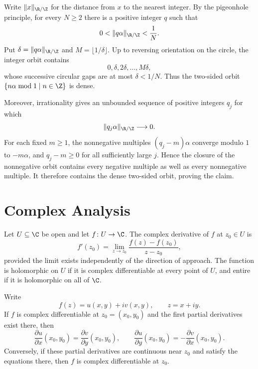     \begin{idea}
        Write $\lVert x\rVert_{\R/\Z}$ for the distance from $x$ to the nearest
        integer. By the pigeonhole principle, for every $N\geq2$ there is a
        positive integer $q$ such that
        \[
            0<\lVert q\alpha\rVert_{\R/\Z}<\frac1N.
        \]
        Put $\delta=\lVert q\alpha\rVert_{\R/\Z}$ and
        $M=\lfloor1/\delta\rfloor$. Up to reversing orientation on the circle,
        the integer orbit contains
        \[
            0,\delta,2\delta,\dots,M\delta,
        \]
        whose successive circular gaps are at most $\delta<1/N$. Thus the
        two-sided orbit $\{n\alpha\bmod1\mid n\in\Z\}$ is dense.

        Moreover, irrationality gives an unbounded sequence of positive
        integers $q_j$ for which
        \[
            \lVert q_j\alpha\rVert_{\R/\Z}\longrightarrow0.
        \]
        For each fixed $m\geq1$, the nonnegative multiples
        $(q_j-m)\alpha$ converge modulo $1$ to $-m\alpha$, and $q_j-m\geq0$
        for all sufficiently large $j$. Hence the closure of the nonnegative
        orbit contains every negative multiple as well as every nonnegative
        multiple. It therefore contains the dense two-sided orbit, proving the
        claim.
    \end{idea}

    \section*{Complex Analysis}

    \begin{definition}
        Let $U\subseteq\C$ be open and let $f\colon U\to\C$. The complex derivative of
        $f$ at $z_0\in U$ is
        \[
            f'(z_0)
            =
            \lim\limits_{z\to z_0}
            \frac{f(z)-f(z_0)}{z-z_0},
        \]
        provided the limit exists independently of the direction of approach.
        The function is holomorphic on $U$ if it is complex differentiable at
        every point of $U$, and entire if it is holomorphic on all of $\C$.
    \end{definition}

    \begin{theorem}
        Write
        \[
            f(z)=u(x,y)+iv(x,y),
            \qquad
            z=x+iy.
        \]
        If $f$ is complex differentiable at $z_0=(x_0,y_0)$ and the first partial
        derivatives exist there, then
        \[
            \frac{\partial u}{\partial x}(x_0,y_0)
            =
            \frac{\partial v}{\partial y}(x_0,y_0),
            \qquad
            \frac{\partial u}{\partial y}(x_0,y_0)
            =
            -\frac{\partial v}{\partial x}(x_0,y_0).
        \]
        Conversely, if these partial derivatives are continuous near $z_0$ and
        satisfy the equations there, then $f$ is complex differentiable at
        $z_0$.
    \end{theorem}

